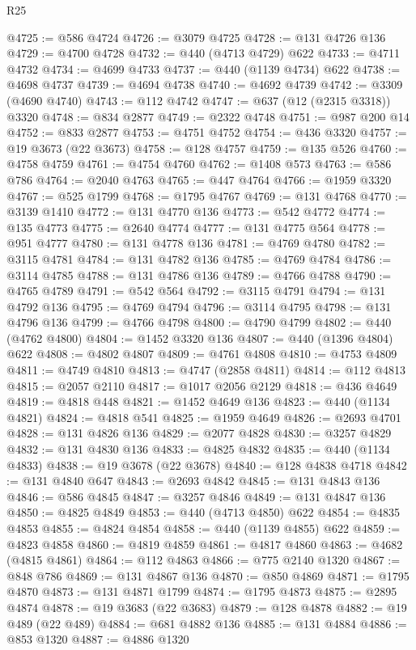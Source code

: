 \begin{lexlean}{R25}
\begin{coremodule}
@4725 := @586 @4724
@4726 := @3079 @4725
@4728 := @131 @4726 @136
@4729 := @4700 @4728
@4732 := @440 (@4713 @4729) @622
@4733 := @4711 @4732
@4734 := @4699 @4733
@4737 := @440 (@1139 @4734) @622
@4738 := @4698 @4737
@4739 := @4694 @4738
@4740 := @4692 @4739
@4742 := @3309 (@4690 @4740)
@4743 := @112 @4742
@4747 := @637 (@12 (@2315 @3318)) @3320
@4748 := @834 @2877
@4749 := @2322 @4748
@4751 := @987 @200 @14
@4752 := @833 @2877
@4753 := @4751 @4752
@4754 := @436 @3320
@4757 := @19 @3673 (@22 @3673)
@4758 := @128 @4757
@4759 := @135 @526
@4760 := @4758 @4759
@4761 := @4754 @4760
@4762 := @1408 @573
@4763 := @586 @786
@4764 := @2040 @4763
@4765 := @447 @4764
@4766 := @1959 @3320
@4767 := @525 @1799
@4768 := @1795 @4767
@4769 := @131 @4768
@4770 := @3139 @1410
@4772 := @131 @4770 @136
@4773 := @542 @4772
@4774 := @135 @4773
@4775 := @2640 @4774
@4777 := @131 @4775 @564
@4778 := @951 @4777
@4780 := @131 @4778 @136
@4781 := @4769 @4780
@4782 := @3115 @4781
@4784 := @131 @4782 @136
@4785 := @4769 @4784
@4786 := @3114 @4785
@4788 := @131 @4786 @136
@4789 := @4766 @4788
@4790 := @4765 @4789
@4791 := @542 @564
@4792 := @3115 @4791
@4794 := @131 @4792 @136
@4795 := @4769 @4794
@4796 := @3114 @4795
@4798 := @131 @4796 @136
@4799 := @4766 @4798
@4800 := @4790 @4799
@4802 := @440 (@4762 @4800)
@4804 := @1452 @3320 @136
@4807 := @440 (@1396 @4804) @622
@4808 := @4802 @4807
@4809 := @4761 @4808
@4810 := @4753 @4809
@4811 := @4749 @4810
@4813 := @4747 (@2858 @4811)
@4814 := @112 @4813
@4815 := @2057 @2110
@4817 := @1017 @2056 @2129
@4818 := @436 @4649
@4819 := @4818 @448
@4821 := @1452 @4649 @136
@4823 := @440 (@1134 @4821)
@4824 := @4818 @541
@4825 := @1959 @4649
@4826 := @2693 @4701
@4828 := @131 @4826 @136
@4829 := @2077 @4828
@4830 := @3257 @4829
@4832 := @131 @4830 @136
@4833 := @4825 @4832
@4835 := @440 (@1134 @4833)
@4838 := @19 @3678 (@22 @3678)
@4840 := @128 @4838 @4718
@4842 := @131 @4840 @647
@4843 := @2693 @4842
@4845 := @131 @4843 @136
@4846 := @586 @4845
@4847 := @3257 @4846
@4849 := @131 @4847 @136
@4850 := @4825 @4849
@4853 := @440 (@4713 @4850) @622
@4854 := @4835 @4853
@4855 := @4824 @4854
@4858 := @440 (@1139 @4855) @622
@4859 := @4823 @4858
@4860 := @4819 @4859
@4861 := @4817 @4860
@4863 := @4682 (@4815 @4861)
@4864 := @112 @4863
@4866 := @775 @2140 @1320
@4867 := @848 @786
@4869 := @131 @4867 @136
@4870 := @850 @4869
@4871 := @1795 @4870
@4873 := @131 @4871 @1799
@4874 := @1795 @4873
@4875 := @2895 @4874
@4878 := @19 @3683 (@22 @3683)
@4879 := @128 @4878
@4882 := @19 @489 (@22 @489)
@4884 := @681 @4882 @136
@4885 := @131 @4884
@4886 := @853 @1320
@4887 := @4886 @1320

\end{coremodule}
\end{lexlean}

